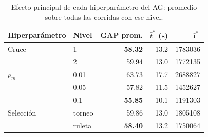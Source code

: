 \begin{table}[htbp]
\centering
\small
\begin{tabular}{llrrr}
\toprule
Hiperparámetro & Nivel & GAP prom. & $\bar t^*$ (s) & $\bar\imath^*$ \\
\midrule
Cruce & 1 & \textbf{58.32} & 13.2 & 1783036 \\
 & 2 & 59.94 & 13.0 & 1772135 \\
\midrule
$p_m$ & 0.01 & 63.73 & 17.7 & 2688827 \\
 & 0.05 & 57.82 & 11.5 & 1452627 \\
 & 0.1 & \textbf{55.85} & 10.1 & 1191303 \\
\midrule
Selección & torneo & 59.86 & 13.0 & 1805108 \\
 & ruleta & \textbf{58.40} & 13.2 & 1750064 \\
\bottomrule
\end{tabular}
\caption{Efecto principal de cada hiperparámetro del AG: promedio sobre todas las corridas con ese nivel.}
\label{tab:efectos_ag}
\end{table}
